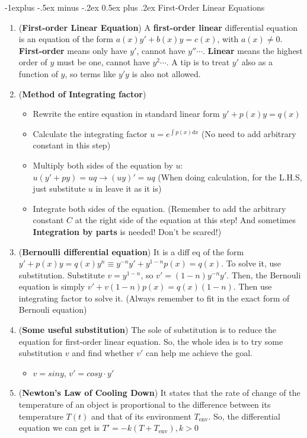 \documentclass[10pt, landscape]{article}
\makeatletter
\renewcommand{\subsection}{\@startsection{subsection}{2}{0mm}%
                                {-1explus -.5ex minus -.2ex}%
                                {0.5ex plus .2ex}%
                                {\normalfont\normalsize\bfseries}}
\makeatother
\begin{document}
\begin{multicols}{4}
\subsection{First-Order Linear Equations}
\begin{enumerate}
    \item (\textbf{First-order Linear Equation}) A \textbf{first-order linear} differential equation is an equation of the form $a(x)y'+b(x)y=c(x)$, with $a(x)\neq 0$. \textbf{First-order} means only have $y'$, cannot have $y'' \cdots$. \textbf{Linear} means the highest order of $y$ must be one, cannot have $y^2 \cdots$. A tip is to treat $y'$ also as a function of $y$, so terms like $y'y$ is also not allowed.
    \item (\textbf{Method of Integrating factor})
    \begin{itemize}
        \item Rewrite the entire equation in standard linear form $y'+p(x)y=q(x)$
        \item Calculate the integrating factor $u=e^{\int p(x)dx}$ (No need to add arbitrary constant in this step)
        \item Multiply both sides of the equation by $u$: $u(y'+py)=uq\rightarrow (uy)'=uq$ (When doing calculation, for the L.H.S, just substitute $u$ in leave it as it is)
        \item Integrate both sides of the equation. (Remember to add the arbitrary constant $C$ at the right side of the equation at this step! And sometimes \textbf{Integration by parts} is needed! Don't be scared!)
    \end{itemize}
    \item (\textbf{Bernoulli differential equation}) It is a diff eq of the form $y'+p(x)y=q(x)y^n\equiv y^{-n}y'+y^{1-n}p(x)=q(x)$. To solve it, use substitution. Substitute $v=y^{1-n}$, so $v'=(1-n)y^{-n}y'$. Then, the Bernouli equation is simply $v'+v(1-n)p(x)=q(x)(1-n)$. Then use integrating factor to solve it. (Always remember to fit in the exact form of Bernouli equation)
    \item (\textbf{Some useful substitution}) The sole of substitution is to reduce the equation for first-order linear equation. So, the whole idea is to try some substitution $v$ and find whether $v'$ can help me achieve the goal.
    \begin{itemize}
        \item $v=siny$, $v'=cosy\cdot y'$
    \end{itemize}
    \item (\textbf{Newton's Law of Cooling Down}) It states that the rate of change of the temperature of an object is proportional to the difference between its temperature $T(t)$ and that of its environment $T_{\text{env}}$. So, the differential equation we can get is $T'=-k(T+T_{\text{env}}),k>0$
\end{enumerate}

\end{multicols}
\end{document}
